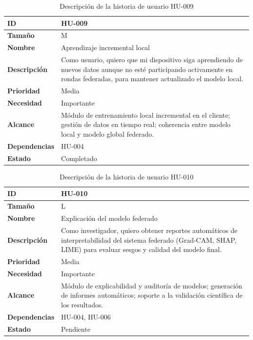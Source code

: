 \documentclass{report}
\begin{document}
\begin{table}[H]
\centering
\caption{Descripción de la historia de usuario HU-009}
\label{tab:hu009}
\begin{tabular}{|l|p{12cm}|}
\hline
\textbf{ID} & HU-009 \\ \hline
\textbf{Tamaño} & M \\ \hline
\textbf{Nombre} & Aprendizaje incremental local \\ \hline
\textbf{Descripción} & 
Como usuario, quiero que mi dispositivo siga aprendiendo de nuevos datos aunque no esté participando activamente en rondas federadas, para mantener actualizado el modelo local. \\ \hline
\textbf{Prioridad} & Media \\ \hline
\textbf{Necesidad} & Importante \\ \hline
\textbf{Alcance} & Módulo de entrenamiento local incremental en el cliente; gestión de datos en tiempo real; coherencia entre modelo local y modelo global federado. \\ \hline
\textbf{Dependencias} & HU-004 \\ \hline
\textbf{Estado} & Completado \\ \hline
\end{tabular}
\end{table}



\begin{table}[H]
\centering
\caption{Descripción de la historia de usuario HU-010}
\label{tab:hu010}
\begin{tabular}{|l|p{12cm}|}
\hline
\textbf{ID} & HU-010 \\ \hline
\textbf{Tamaño} & L \\ \hline
\textbf{Nombre} & Explicación del modelo federado \\ \hline
\textbf{Descripción} & 
Como investigador, quiero obtener reportes automáticos de interpretabilidad del sistema federado (Grad-CAM, SHAP, LIME) para evaluar sesgos y calidad del modelo final. \\ \hline
\textbf{Prioridad} & Media \\ \hline
\textbf{Necesidad} & Importante \\ \hline
\textbf{Alcance} & Módulo de explicabilidad y auditoría de modelos; generación de informes automáticos; soporte a la validación científica de los resultados. \\ \hline
\textbf{Dependencias} & HU-004, HU-006 \\ \hline
\textbf{Estado} & Pendiente \\ \hline
\end{tabular}
\end{table}
\end{document}
